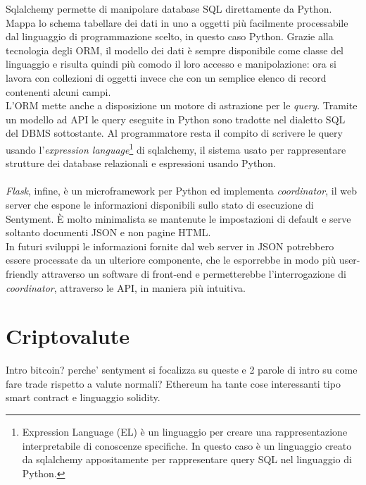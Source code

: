 \documentclass[a4paper,12pt]{report}
\begin{document}
Sqlalchemy permette di manipolare database SQL direttamente da Python. Mappa lo schema tabellare dei dati in uno a oggetti più facilmente processabile dal linguaggio di programmazione scelto, in questo caso Python. Grazie alla tecnologia degli ORM, il modello dei dati è sempre disponibile come classe del linguaggio e risulta quindi più comodo il loro accesso e manipolazione: ora si lavora con collezioni di oggetti invece che con un semplice elenco di record contenenti alcuni campi.\\
L'ORM mette anche a disposizione un motore di astrazione per le \textit{query}. Tramite un modello ad API le query eseguite in Python sono tradotte nel dialetto SQL del DBMS sottostante. Al programmatore resta il compito di scrivere le query usando l'\textit{expression language}\footnote{Expression Language (EL) è un linguaggio per creare una rappresentazione interpretabile di conoscenze specifiche. In questo caso è un linguaggio creato da sqlalchemy appositamente per rappresentare query SQL nel linguaggio di Python.} di sqlalchemy, il sistema usato per rappresentare strutture dei database relazionali e espressioni usando Python.\\~\\

\textit{Flask}, infine, è un microframework per Python ed implementa \textit{coordinator}, il web server che espone le informazioni disponibili sullo stato di esecuzione di Sentyment. È molto minimalista se mantenute le impostazioni di default e serve soltanto documenti JSON e non pagine HTML.\\
In futuri sviluppi le informazioni fornite dal web server in JSON potrebbero essere processate da un ulteriore componente, che le esporrebbe in modo più user-friendly attraverso un software di front-end e permetterebbe l'interrogazione di \textit{coordinator}, attraverso le API, in maniera più intuitiva.


\newpage
\chapter{Criptovalute}
Intro bitcoin? perche' sentyment si focalizza su queste e 2 parole di intro su come fare trade rispetto a valute normali?
Ethereum ha tante cose interessanti tipo smart contract e linguaggio solidity.

\newpage
\end{document}
